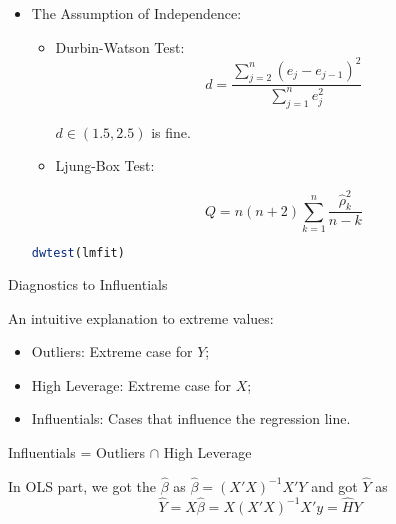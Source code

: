 \begin{itemize}[topsep=2pt,itemsep=2pt]
\begin{rcode}
\end{rcode}


    \item The Assumption of Independence:
    \begin{itemize}
        \item Durbin-Watson Test:  
        \begin{equation}
            d=\dfrac{\sum_{j=2}^n(e_j-e_{j-1})^2}{\sum_{j=1}^ne_j^2} 
        \end{equation}
        
        $ d\in (1.5,2.5) $ is fine.
        \item Ljung-Box Test:
        
        \begin{equation}
            Q=n(n+2)\sum_{k=1}^n\dfrac{\hat{\rho}_k^2}{n-k} 
        \end{equation}
        
        
    \end{itemize}

\begin{rcode}
\begin{lstlisting}[language=R]
dwtest(lmfit)
\end{lstlisting}

\end{rcode}   
        
\end{itemize}

\begin{point}
    Diagnostics to Influentials
\end{point}

    An intuitive explanation to extreme values:
    \begin{itemize}[topsep=2pt,itemsep=2pt]
        \item Outliers: Extreme case for $ Y $;
        \item High Leverage: Extreme case for $ X $;
        \item Influentials: Cases that influence the regression line.
    \end{itemize}

    Influentials = Outliers $ \cap $ High Leverage

    In OLS part, we got the $ \hat{\beta}  $ as $\hat{ \beta} = (X'X)^{-1}X'Y $ and got $ \hat{Y} $ as 
    \begin{equation}
        \hat{Y}= X\hat{\beta }=X(X'X)^{-1}X'y=\hat{H}Y
    \end{equation}
    
